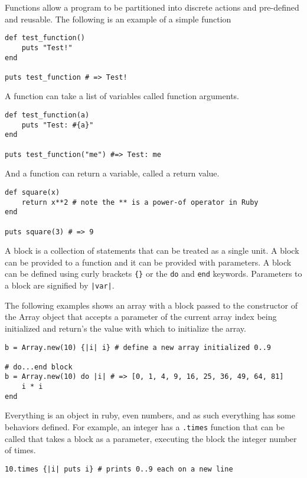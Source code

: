 Functions allow a program to be partitioned into discrete actions and pre-defined and reusable. The following is an example of a simple function

\begin{lstlisting}
def test_function()
	puts "Test!"
end

puts test_function # => Test!
\end{lstlisting}

A function can take a list of variables called function arguments.

\begin{lstlisting}
def test_function(a)
	puts "Test: #{a}"
end

puts test_function("me") #=> Test: me
\end{lstlisting}

And a function can return a variable, called a return value.

\begin{lstlisting}
def square(x)
	return x**2 # note the ** is a power-of operator in Ruby
end

puts square(3) # => 9
\end{lstlisting}

A block is a collection of statements that can be treated as a single unit. A block can be provided to a function and it can be provided with parameters. A block can be defined using curly brackets \texttt{\{\}} or the \texttt{do} and \texttt{end} keywords. Parameters to a block are signified by \texttt{|var|}.

The following examples shows an array with a block passed to the constructor of the Array object that accepts a parameter of the current array index being initialized and return's the value with which to initialize the array.

\begin{lstlisting}
b = Array.new(10) {|i| i} # define a new array initialized 0..9

# do...end block
b = Array.new(10) do |i| # => [0, 1, 4, 9, 16, 25, 36, 49, 64, 81]
	i * i
end
\end{lstlisting}

Everything is an object in ruby, even numbers, and as such everything has some behaviors defined. For example, an integer has a \texttt{.times} function that can be called that takes a block as a parameter, executing the block the integer number of times.

\begin{lstlisting}
10.times {|i| puts i} # prints 0..9 each on a new line
\end{lstlisting}

